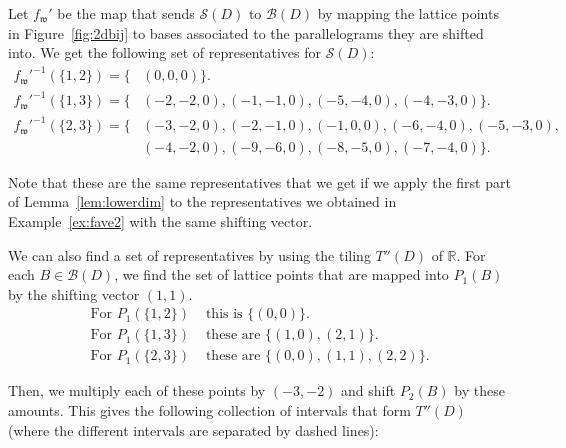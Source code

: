 \documentclass[ALCO,ThmDefs,Unicode,epreuves]{cedram}
\newcommand{\R}{\mathbb{R}}
\newcommand{\B}{\mathcal{B}}
\newcommand{\Sand}{\mathcal{S}}
\newcommand{\w}{\mathfrak w}
\begin{document}
\begin{exam}
Let $f_{\w}'$ be the map that sends $\Sand(D)$ to $\B(D)$ by mapping the lattice points in Figure~\ref{fig:2dbij} to bases associated to the parallelograms they are shifted into. We get the following set of representatives for $\Sand(D)$: 
\begin{align*}
f_{\w}'^{-1}(\{1,2\}) = \{&(0,0,0)\}.\\
f_{\w}'^{-1}(\{1,3\}) = \{&(-2,-2,0),(-1,-1,0),(-5,-4,0),(-4,-3,0)\}.\\
f_{\w}'^{-1}(\{2,3\}) = \{&(-3,-2,0),(-2,-1,0),(-1,0,0),(-6,-4,0),(-5,-3,0),\\
&(-4,-2,0),(-9,-6,0),(-8,-5,0),(-7,-4,0)\}.
\end{align*}

Note that these are the same representatives that we get if we apply the first part of Lemma~\ref{lem:lowerdim} to the representatives we obtained in Example~\ref{ex:fave2} with the same shifting vector. 

We can also find a set of representatives by using the tiling $T''(D)$ of $\R$. For each $B \in \B(D)$, we find the set of lattice points that are mapped into $P_1(B)$ by the shifting vector $(1,1)$. 
\begin{align*}
\text{For }P_1(\{1,2\}) &\text{ this is } \{(0,0)\}.\\ 
\text{For }P_1(\{1,3\}) &\text{ these are } \{(1,0),(2,1)\}.\\ 
\text{For }P_1(\{2,3\}) &\text{ these are } \{(0,0),(1,1),(2,2)\}.
\end{align*}

Then, we multiply each of these points by $(-3,-2)$ and shift $P_2(B)$ by these amounts. This gives the following collection of intervals that form $T''(D)$ (where the different intervals are separated by dashed lines):

\begin{figure}[htb]\centering
{}
\end{figure}
\end{exam}
\end{document}

